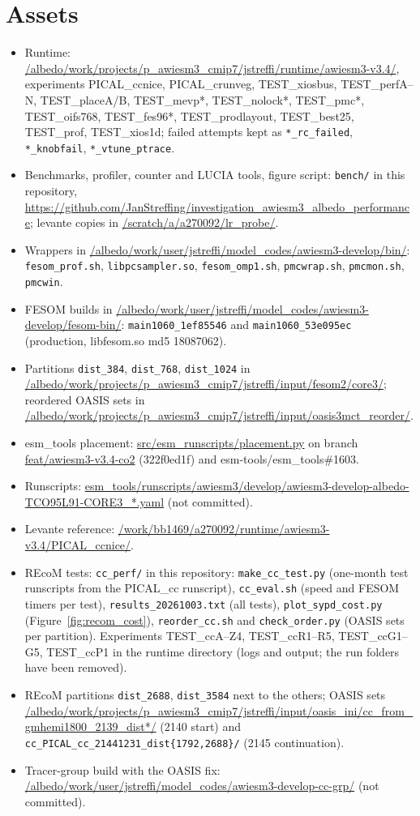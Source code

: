 \documentclass[11pt,a4paper]{article}
\begin{document}
\section{Assets}
\begin{itemize}
\item Runtime: \url{/albedo/work/projects/p_awiesm3_cmip7/jstreffi/runtime/awiesm3-v3.4/}, experiments PICAL\_ccnice, PICAL\_crunveg, TEST\_xiosbus, TEST\_perfA--N, TEST\_placeA/B, TEST\_mevp*, TEST\_nolock*, TEST\_pmc*, TEST\_oifs768, TEST\_fes96*, TEST\_prodlayout, TEST\_best25, TEST\_prof, TEST\_xios1d; failed attempts kept as \texttt{*\_rc\_failed}, \texttt{*\_knobfail}, \texttt{*\_vtune\_ptrace}.
\item Benchmarks, profiler, counter and LUCIA tools, figure script: \texttt{bench/} in this repository, \url{https://github.com/JanStreffing/investigation_awiesm3_albedo_performance}; levante copies in \url{/scratch/a/a270092/lr_probe/}.
\item Wrappers in \url{/albedo/work/user/jstreffi/model_codes/awiesm3-develop/bin/}: \texttt{fesom\_prof.sh}, \texttt{libpcsampler.so}, \texttt{fesom\_omp1.sh}, \texttt{pmcwrap.sh}, \texttt{pmcmon.sh}, \texttt{pmcwin}.
\item FESOM builds in \url{/albedo/work/user/jstreffi/model_codes/awiesm3-develop/fesom-bin/}: \texttt{main1060\_1ef85546} and \texttt{main1060\_53e095ec} (production, libfesom.so md5 18087062).
\item Partitions \texttt{dist\_384}, \texttt{dist\_768}, \texttt{dist\_1024} in \url{/albedo/work/projects/p_awiesm3_cmip7/jstreffi/input/fesom2/core3/}; reordered OASIS sets in \url{/albedo/work/projects/p_awiesm3_cmip7/jstreffi/input/oasis3mct_reorder/}.
\item esm\_tools placement: \url{src/esm_runscripts/placement.py} on branch \url{feat/awiesm3-v3.4-co2} (322f0ed1f) and esm-tools/esm\_tools\#1603.
\item Runscripts: \url{esm_tools/runscripts/awiesm3/develop/awiesm3-develop-albedo-TCO95L91-CORE3_*.yaml} (not committed).
\item Levante reference: \url{/work/bb1469/a270092/runtime/awiesm3-v3.4/PICAL_ccnice/}.
\item REcoM tests: \texttt{cc\_perf/} in this repository: \texttt{make\_cc\_test.py} (one-month test runscripts from the PICAL\_cc runscript), \texttt{cc\_eval.sh} (speed and FESOM timers per test), \texttt{results\_20261003.txt} (all tests), \texttt{plot\_sypd\_cost.py} (Figure~\ref{fig:recom_cost}), \texttt{reorder\_cc.sh} and \texttt{check\_order.py} (OASIS sets per partition). Experiments TEST\_ccA--Z4, TEST\_ccR1--R5, TEST\_ccG1--G5, TEST\_ccP1 in the runtime directory (logs and output; the run folders have been removed).
\item REcoM partitions \texttt{dist\_2688}, \texttt{dist\_3584} next to the others; OASIS sets \url{/albedo/work/projects/p_awiesm3_cmip7/jstreffi/input/oasis_ini/cc_from_gmhemi1800_2139_dist*/} (2140 start) and \texttt{cc\_PICAL\_cc\_21441231\_dist\{1792,2688\}/} (2145 continuation).
\item Tracer-group build with the OASIS fix: \url{/albedo/work/user/jstreffi/model_codes/awiesm3-develop-cc-grp/} (not committed).
\end{itemize}
\end{document}
